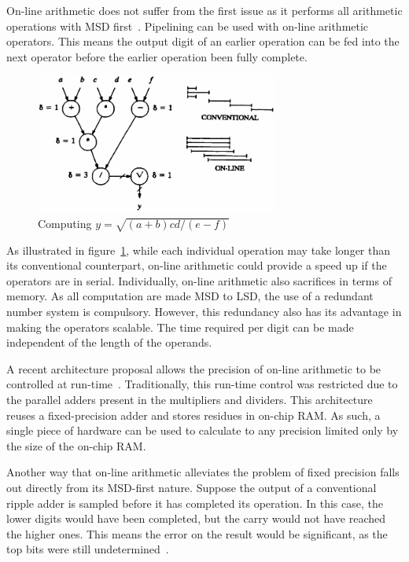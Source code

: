 \documentclass[journal]{IEEEtran}
\begin{document}
On-line arithmetic does not suffer from the first issue as it performs all
arithmetic operations with MSD first~\cite{Ercegovac1}.
Pipelining can be used with on-line arithmetic operators.
This means the output digit of an earlier operation can be fed into the next
operator before the earlier operation been fully complete.

\begin{figure}[H]
  \centering
  \includegraphics[width=8cm]{img/Online}
  \caption{Computing $y=\sqrt{(a+b)cd/(e-f)}$~\cite{Ercegovac1}}
  \label{Online}
\end{figure}

As illustrated in figure~\ref{Online}, while each individual operation may
take longer than its conventional counterpart, on-line arithmetic could provide
a speed up if the operators are in serial.
Individually, on-line arithmetic also sacrifices in terms of memory.
As all computation are made MSD to LSD, the use of a redundant number system
is compulsory.
However, this redundancy also has its advantage in making the operators
scalable.
The time required per digit can be made independent of the length of the
operands.~\cite{Trivedi1}

A recent architecture proposal allows the precision of
on-line arithmetic to be controlled at run-time~\cite{Zhao1}.
Traditionally, this run-time control was restricted due to the parallel adders
present in the multipliers and dividers.
This architecture reuses a fixed-precision adder and stores residues in
on-chip RAM.
As such, a single piece of hardware can be used to calculate to any precision
limited only by the size of the on-chip RAM.

Another way that on-line arithmetic alleviates the problem of fixed precision
falls out directly from its MSD-first nature.
Suppose the output of a conventional ripple adder is sampled before
it has completed its operation.
In this case, the lower digits would have been completed, but the carry would
not have reached the higher ones.
This means the error on the result would be significant, as the top bits
were still undetermined~\cite{Shi1}.
\end{document}
